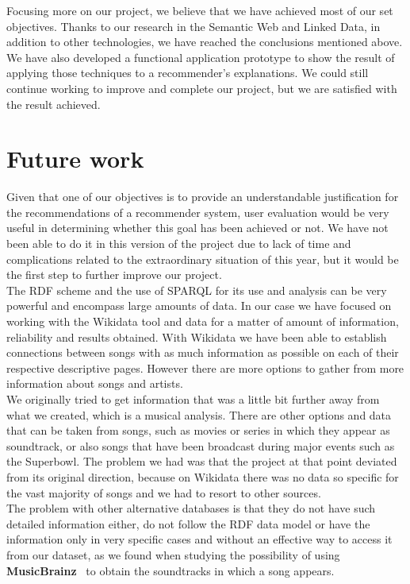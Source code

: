 Focusing more on our project, we believe that we have achieved most of our set objectives. Thanks to our research in the Semantic Web and Linked Data, in addition to other technologies, we have reached the conclusions mentioned above. We have also developed a functional application prototype to show the result of applying those techniques to a recommender’s explanations. We could still continue working to improve and complete our project, but we are satisfied with the result achieved.\\

\section{Future work}

Given that one of our objectives is to provide an understandable justification for the recommendations of a recommender system, user evaluation would be very useful in determining whether this goal has been achieved or not. We have not been able to do it in this version of the project due to lack of time and complications related to the extraordinary situation of this year, but it would be the first step to further improve our project.\\

The RDF scheme and the use of SPARQL for its use and analysis can be very powerful and encompass large amounts of data. In our case we have focused on working with the Wikidata tool and data for a matter of amount of information, reliability and results obtained. With Wikidata we have been able to establish connections between songs with as much information as possible on each of their respective descriptive pages. However there are more options to gather from more information about songs and artists.\\

We originally tried to get information that was a little bit further away from what we created, which is a musical analysis. There are other options and data that can be taken from songs, such as movies or series in which they appear as soundtrack, or also songs that have been broadcast during major events such as the Superbowl. The problem we had was that the project at that point deviated from its original direction, because on Wikidata there was no data so specific for the vast majority of songs and we had to resort to other sources.\\

The problem with other alternative databases is that they do not have such detailed information either, do not follow the RDF data model or have the information only in very specific cases and without an effective way to access it from our dataset, as we found when studying the possibility of using \textbf{MusicBrainz}~\cite{musicbrainz} to obtain the soundtracks in which a song appears.\\

